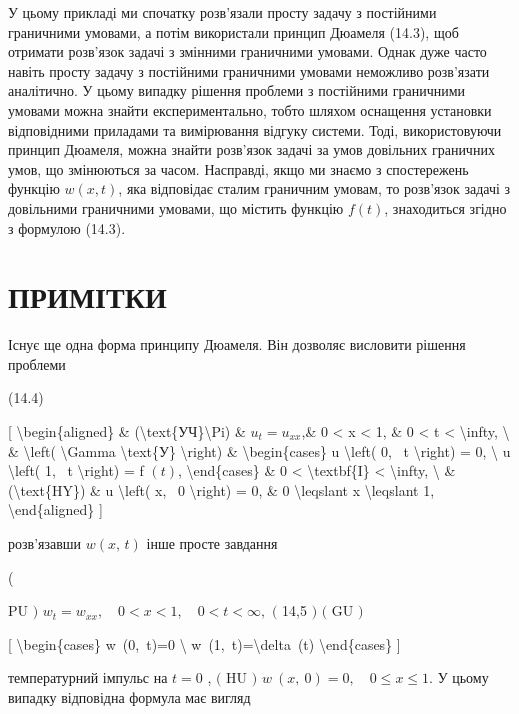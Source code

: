 \documentclass[
]{article}
\begin{document}
{{У цьому прикладі ми спочатку розв'язали просту задачу з постійними
граничними умовами, а потім використали принцип Дюамеля (14.3), щоб
отримати розв'язок задачі з змінними граничними умовами. Однак дуже
часто навіть просту задачу з постійними граничними умовами неможливо
розв'язати аналітично. У цьому випадку рішення проблеми з постійними
граничними умовами можна знайти експериментально, тобто шляхом оснащення
установки відповідними приладами та вимірювання відгуку системи. Тоді,
використовуючи принцип Дюамеля, можна знайти розв'язок задачі за умов
довільних граничних умов, що змінюються за часом. Насправді, якщо ми
знаємо з спостережень функцію \(w(x, t)\), яка відповідає сталим
граничним умовам, то розв'язок задачі з довільними граничними умовами,
що містить функцію \(f(t)\), знаходиться згідно з формулою (14.3).

\section{ПРИМІТКИ}\label{ux43fux440ux438ux43cux456ux442ux43aux438-3}

Існує ще одна форма принципу Дюамеля. Він дозволяє висловити рішення
проблеми

(14.4)

{[} \textbackslash begin\{aligned\} \&
(\textbackslash text\{УЧ\}\textbackslash Pi) \& \(u_t = u_{xx}\),\& 0
\textless{} x \textless{} 1, \& 0 \textless{} t \textless{}
\textbackslash infty, \textbackslash{} \& \textbackslash left(
\textbackslash Gamma \textbackslash text\{У\} \textbackslash right) \&
\textbackslash begin\{cases\} u \textbackslash left( 0, ~t
\textbackslash right) = 0, \textbackslash{} u \textbackslash left( 1, ~t
\textbackslash right) = f \(\left( t \right)\),
\textbackslash end\{cases\} \& 0 \textless{} \textbackslash textbf\{I\}
\textless{} \textbackslash infty, \textbackslash{} \&
(\textbackslash text\{HY\}) \& u \textbackslash left( x, ~0
\textbackslash right) = 0, \& 0 \textbackslash leqslant x
\textbackslash leqslant 1, \textbackslash end\{aligned\} {]}

розв'язавши \(w\left(x,\,t\right)\) інше просте завдання

(

PU \()\) \(w_t=w_{xx}, \quad 0< x<1, \quad 0< t<\infty,\) \((\) 14,5
\()\) \((\) GU \()\)

{[} \textbackslash begin\{cases\} w~(0,~t)=0 \textbackslash{}
w~(1,~t)=\textbackslash delta~(t) \textbackslash end\{cases\} {]}

температурний імпульс на \(t=0\) , \((\) HU \()\)
\(w\ (x,\ 0)=0, \quad 0\leqslant x\leqslant 1.\) У цьому випадку
відповідна формула має вигляд

}}
\end{document}
